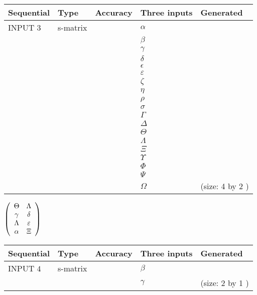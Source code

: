 \documentclass[12pt]{article}
\begin{document}
  
\noindent\begin{tabular}{|l|l|l|l|l|}
\hline
 Sequential & Type & Accuracy & Three inputs & Generated \\ 
\hline
 
 
  INPUT $            3 $ & s-matrix & & 
 $  \alpha $ & 
  \\
  & & & 
 $  \beta $ & 
  \\
  & & & 
 $  \gamma $ & 
  \\
  & & & 
 $  \delta $ & 
  \\
  & & & 
 $  \epsilon $ & 
  \\
  & & & 
 $  \varepsilon $ & 
  \\
  & & & 
 $                     \zeta $ & 
  \\
  & & & 
 $  \eta $ & 
  \\
  & & & 
 $  \rho $ & 
  \\
  & & & 
 $  \sigma $ & 
  \\
  & & & 
 $  \Gamma $ & 
  \\
  & & & 
 $  \Delta $ & 
  \\
  & & & 
 $  \Theta $ & 
  \\
  & & & 
 $  \Lambda $ & 
  \\
  & & & 
 $                     \Xi $ & 
  \\
  & & & 
 $  \Upsilon $ & 
  \\
  & & & 
 $  \Phi $ & 
  \\
  & & & 
 $  \Psi $ & 
  \\
  & & & 
 $  \Omega $ & 
  (size:            4  by            2 )
 \\  \hline  
 \end{tabular}
   
   
 $  \left( \begin{array}
 {
 c
 c
 }
 \Theta & 
 \Lambda \\ 
 \gamma & 
 \delta \\ 
 \Lambda & 
 \varepsilon \\ 
 \alpha & 
                    \Xi
 \end{array} \right) $ 
  
  
\noindent\begin{tabular}{|l|l|l|l|l|}
\hline
 Sequential & Type & Accuracy & Three inputs & Generated \\ 
\hline
 
 
  INPUT $            4 $ & s-matrix & & 
 $  \beta $ & 
  \\
  & & & 
 $  \gamma $ & 
  (size:            2  by            1 )
 \\  \hline  
 \end{tabular}
   
\end{document}
